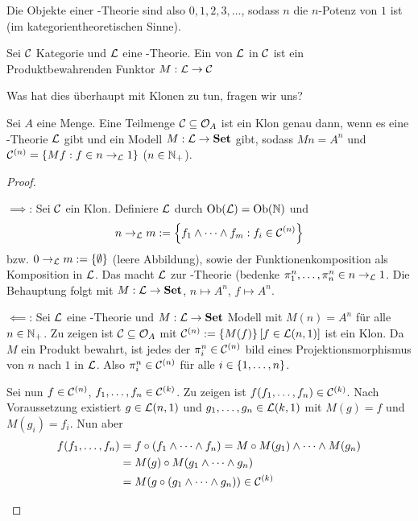 \documentclass{book}
\begin{document}
\begin{remark}
    Die Objekte einer -Theorie sind also $0,1,2,3,\ldots$, sodass $n$ die $n$-Potenz von $1$ ist (im kategorientheoretischen Sinne).
\end{remark}

\begin{definition}
    Sei $\mathcal{C}$ Kategorie und $\mathcal{L}$ eine -Theorie. Ein  von $\mathcal{L}$ in $\mathcal{C}$ ist ein Produktbewahrenden Funktor $M:\mathcal{L}\rightarrow\mathcal{C}$ 
\end{definition}

Was hat dies überhaupt mit Klonen zu tun, fragen wir uns?

\begin{proposition}
    Sei $A$ eine Menge. Eine Teilmenge $\mathcal{C}\subseteq \mathcal{O}_A$ ist ein Klon genau dann, wenn es eine -Theorie $\mathcal{L}$ gibt und ein Modell $M:\mathcal{L}\rightarrow\mathbf{Set}$ gibt, sodass $Mn=A^n$ und $\mathcal{C}^{(n)}=\left\{Mf:f\in n\rightarrow_{\mathcal{L}} 1\right\}$ ($n\in\mathbb{N}_+$). 
\end{proposition}

\begin{proof}
    \begin{implications}
            \item[$\implies$:] 
        Sei $\mathcal{C}$ ein Klon. Definiere $\mathcal{L}$ durch $\mathop\mathrm{Ob}(\mathcal{L})=\mathop\mathrm{Ob}(\mathbb{N})$ und
        $$
        n\rightarrow_{\mathcal{L}} m:=\left\{f_1\wedge\cdots\wedge f_m:f_i\in\mathcal{C}^{(n)}\right\}
        $$
        bzw. $0\rightarrow_{\mathcal{L}} m:=\left\{\emptyset\right\}$ (leere Abbildung), sowie der Funktionenkomposition als Komposition in $\mathcal{L}$. Das macht $\mathcal{L}$ zur -Theorie (bedenke $\pi_1^n,\ldots,\pi^n_n\in n\rightarrow_{\mathcal{L}} 1$. Die Behauptung folgt mit $M:\mathcal{L}\rightarrow\mathbf{Set}$, $n\mapsto A^n$, $f\mapsto A^n$.
            \item[$\impliedby$:] Sei $\mathcal{L}$ eine -Theorie und $M:\mathcal{L}\rightarrow\mathbf{Set}$ Modell mit $M(n)=A^n$ für alle $n\in\mathbb{N}_+$. Zu zeigen ist $\mathcal{C}\subseteq\mathcal{O}_A$ mit $\mathcal{C}^{(n)}:=\left\{M(f)\right\}[f\in\mathcal{L}(n,1)]$ ist ein Klon. Da $M$ ein Produkt bewahrt, ist jedes der $\pi^n_i\in\mathcal{C}^{(n)}$ bild eines Projektionsmorphismus von $n$ nach $1$ in $\mathcal{L}$. Also $\pi^n_i\in\mathcal{C}^{(n)}$ für alle $i\in\left\{1,\ldots,n\right\}$.

        Sei nun $f\in\mathcal{C}^{(n)}$, $f_1,\ldots,f_n\in\mathcal{C}^{(k)}$. Zu zeigen ist $f(f_1,\ldots,f_n)\in\mathcal{C}^{(k)}$. Nach Voraussetzung existiert $g\in\mathcal{L}(n,1)$ und $g_1,\ldots,g_n\in\mathcal{L}(k,1)$ mit $M(g)=f$ und $M(g_i)=f_i$. Nun aber
        \begin{align*}
            f(f_1,\ldots,f_n) &= f\circ(f_1\wedge\cdots\wedge f_n)=M\circ M(g_1)\wedge\cdots\wedge M(g_n)\\
            &= M(g)\circ M(g_1\wedge\cdots\wedge g_n)\\
            &= M(g\circ(g_1\wedge\cdots\wedge g_n))\in\mathcal{C}^{(k)}
        \end{align*}
    \end{implications}
\end{proof}
\end{document}
